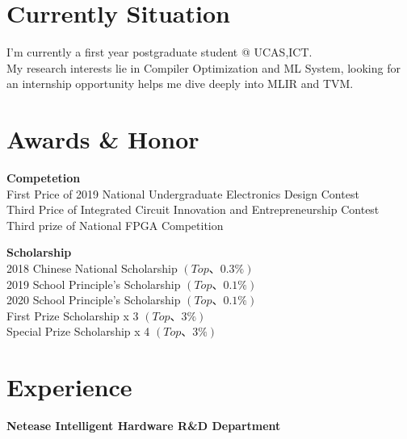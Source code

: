 \documentclass[a4paper,10pt]{article}
\begin{document}
\begin{adjustbox}{valign=t}
\begin{minipage}{0.6\textwidth} %
\section*{Currently Situation}
\begin{description}
	\raggedright
	\item I'm currently a first year postgraduate student @ UCAS,ICT.\\
	My research interests lie in Compiler Optimization and ML System, looking for an internship opportunity helps me dive deeply into MLIR and TVM. \\
\end{description}

\section*{Awards \& Honor}
\begin{description}
\raggedright
\item [] \textbf{Competetion} \\
	First Price of 2019 National Undergraduate Electronics Design Contest \\
	Third Price of Integrated Circuit Innovation and Entrepreneurship Contest \\
	Third prize of National FPGA Competition \\

	\item [] \textbf{Scholarship} \\
	2018 Chinese National Scholarship $\left( Top 、 0.3 \% \right)$ \\
	2019 School Principle's Scholarship $\left( Top 、 0.1 \% \right)$ \\
	2020 School Principle's Scholarship $\left( Top 、 0.1 \% \right)$ \\
	First Prize Scholarship x 3 $\left( Top 、 3 \% \right)$ \\
	Special Prize Scholarship x 4 $\left( Top 、 3 \% \right)$ 


\end{description}

\section*{Experience}
\begin{description}
\raggedright
\item[\normalfont \textcolor{ColorOne}{Sep. 2021 - Oct. 2021.}] 
	\textbf{Netease Intelligent Hardware R\&D Department}\\ \medskip
	

\end{description}
\end{minipage}
\end{adjustbox}
\end{document}
